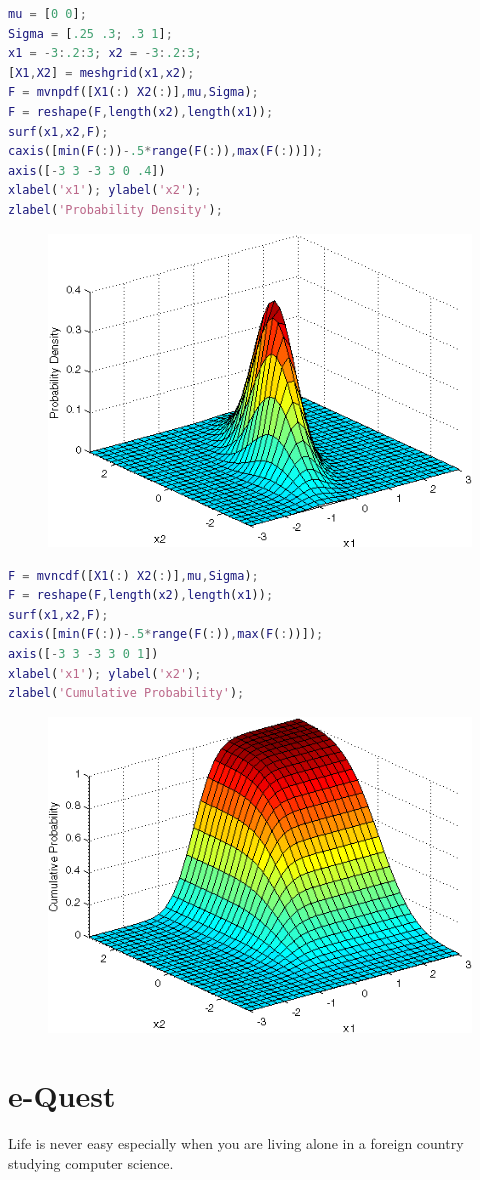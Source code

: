\documentclass{article}
\begin{document}
\begin{lstlisting}[language=Matlab]
mu = [0 0];
Sigma = [.25 .3; .3 1];
x1 = -3:.2:3; x2 = -3:.2:3;
[X1,X2] = meshgrid(x1,x2);
F = mvnpdf([X1(:) X2(:)],mu,Sigma);
F = reshape(F,length(x2),length(x1));
surf(x1,x2,F);
caxis([min(F(:))-.5*range(F(:)),max(F(:))]);
axis([-3 3 -3 3 0 .4])
xlabel('x1'); ylabel('x2');
zlabel('Probability Density');
\end{lstlisting}

\begin{figure}[htbp]
  \centering
  \includegraphics[scale=0.75]{multivariate_normal1}
\end{figure}

\begin{lstlisting}[language=Matlab]
F = mvncdf([X1(:) X2(:)],mu,Sigma);
F = reshape(F,length(x2),length(x1));
surf(x1,x2,F);
caxis([min(F(:))-.5*range(F(:)),max(F(:))]);
axis([-3 3 -3 3 0 1])
xlabel('x1'); ylabel('x2');
zlabel('Cumulative Probability');
\end{lstlisting}

\begin{figure}[htbp]
  \centering
  \includegraphics[scale=0.75]{multivariate_normal2}
\end{figure}



\section{e-Quest}
\label{sec:e-quest}

Life is never easy especially when you are living alone in a foreign
country studying computer science. 
\end{document}
